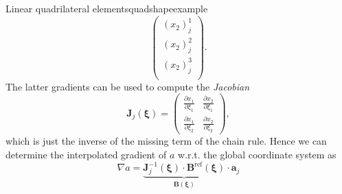 \begin{example}{Linear quadrilateral elements}{quadshapeexample}
\begin{equation}
\begin{pmatrix}
            {(x_2)}_j^1 \\
            {(x_2)}_j^2 \\
            {(x_2)}_j^3 \\
        \end{pmatrix}.
    \end{equation}
    The latter gradients can be used to compute the \emph{Jacobian} 
    \begin{equation}
        \mathbf{J}_j(\pmb{\xi})
        = 
        \begin{pmatrix}
            \frac{\partial x_1}{\partial \xi_1} & \frac{\partial x_2}{\partial \xi_1} \\
            \frac{\partial x_1}{\partial \xi_2} & \frac{\partial x_2}{\partial \xi_2}
        \end{pmatrix},
    \end{equation}
    which is just the inverse of the missing term of the chain rule. Hence we can determine the interpolated gradient of $a$ w.r.t. the global coordinate system as 
    \begin{equation}
        \nabla a = 
        \underbrace{
            \mathbf{J}_j^{-1}(\pmb{\xi}) 
            \cdot 
            \mathbf{B}^\textrm{ref}(\pmb{\xi})
            }_{\mathbf{B}(\pmb{\xi})}
        \cdot  \mathbf{a}_j
    \end{equation}
\end{example}

